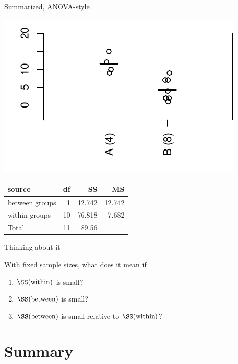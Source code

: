 \begin{frame}{Summarized, ANOVA-style}

  \begin{center}
    \includegraphics{dots4ex.pdf}

    \vspace{2em}

    \begin{tabular}{lrrr}
      source & df & SS & MS \\
      \hline
      between groups & 1 & 12.742 & 12.742 \\
      within groups & 10 & 76.818 & 7.682 \\
      \hline
      Total & 11 & 89.56 &  \\
    \end{tabular}

  \end{center}

\end{frame}

\begin{frame}{Thinking about it}

  With fixed sample sizes, what does it mean if
  \begin{enumerate}
    \item $\SS(\text{within})$ is small?
    \item $\SS(\text{between})$ is small?
    \item $\SS(\text{between})$ is small relative to $\SS(\text{within})$?
  \end{enumerate}

\end{frame}

\section<article>{Summary}
